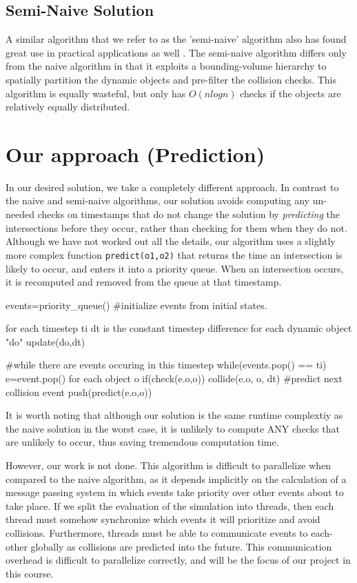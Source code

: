 \documentclass{article}
\begin{document}
\subsection*{Semi-Naive Solution}
A similar algorithm that we refer to as the 'semi-naive' algorithm also has found great use in practical applications as well \cite{Bittner02hierarchicaltechniques}.  The semi-naive algorithm differs only from the naive algorithm in that it exploits a bounding-volume hierarchy to spatially partition the dynamic objects and pre-filter the collision checks.  This algorithm is equally wasteful, but only has $O(n log n)$ checks if the objects are relatively equally distributed.

\section*{Our approach (Prediction)}
In our desired solution, we take a completely different approach.  In contrast to the naive and semi-naive algorithms, our solution avoids computing any un-needed checks on timestamps that do not change the solution by \textit{predicting} the intersections before they occur, rather than checking for them when they do not.  Although we have not worked out all the details, our algorithm uses a slightly more complex function \texttt{predict(o1,o2)} that returns the time an intersection is likely to occur, and enters it into a priority queue.  When an intersection occurs, it is recomputed and removed from the queue at that timestamp.

\begin{verbatimtab}[4]
events=priority_queue()
#initialize events from initial states.

for each timestep ti
	dt is the constant timestep difference
	for each dynamic object "do"
		update(do,dt)

	#while there are events occuring in this timestep
	while(events.pop() == ti)
		e=event.pop()  
		for each object o
			if(check(e.o,o))
				collide(e.o, o, dt)
				#predict next collision event
				push(predict(e.o,o)) 
\end{verbatimtab}

It is worth noting that although our solution is the same runtime complextiy as the naive solution in the worst case, it is unlikely to compute ANY checks that are unlikely to occur, thus saving tremendous computation time.  

However, our work is not done.  This algorithm is difficult to parallelize when compared to the naive algorithm, as it depends implicitly on the calculation of a message passing system in which events take priority over other events about to take place.
If we split the evaluation of the simulation into threads, then each thread must somehow synchronize which events it will prioritize and avoid collisions.  Furthermore, threads must be able
to communicate events to each-other globally as collisions are predicted into the future.  This communication overhead is difficult to parallelize correctly, and will be the focus of our project in this course.
\end{document}
